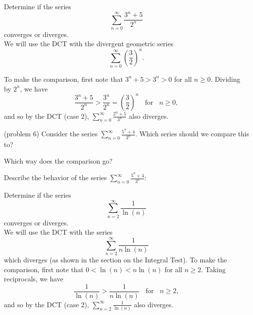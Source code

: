 \documentclass{ximera}
\begin{document}
\begin{example}[example 6] %
Determine if the series 
\[
\sum_{n=0}^\infty \frac{3^n + 5}{2^n}
\]
 converges or diverges.\\
We will use the DCT with the divergent geometric series 
\[
\sum_{n=0}^\infty \left(\frac32\right)^n.
\]

To make the comparison, first note that $3^n + 5 > 3^n > 0$ for all $n \geq 0$. Dividing by $2^n$, we have 
\[
\frac{3^n + 5}{2^n} > \frac{3^n}{2^n} = \left(\frac32\right)^n \;\; \text{ for } \;\; n \geq 0,
\]
and so by the DCT (case 2), $\sum_{n=0}^\infty \frac{2^n + 5}{3^n}$ also diverges.
\end{example}


\begin{problem}(problem 6)
Consider the series $\displaystyle{\sum_{n=0}^\infty \frac{5^n + 4}{3^n}}$.
Which series should we compare this to?

\begin{multipleChoice}
\end{multipleChoice}

Which way does the comparison go?
\begin{multipleChoice}
\end{multipleChoice}

Describe the behavior of the series $\sum_{n=0}^\infty \frac{5^n + 4}{3^n}:$
\begin{multipleChoice}
\end{multipleChoice}

\end{problem}



\begin{example}[example 7] %
Determine if the series 
\[
\sum_{n=2}^\infty \frac{1}{\ln(n)}
\]
converges or diverges.\\
We will use the DCT with the series 
\[
\sum_{n=2}^\infty \frac{1}{n\ln(n)}
\]
 which diverges (as shown in the section on the Integral Test).
To make the comparison, first note that $0 < \ln(n) < n\ln(n)$ for all $n \geq 2$. Taking reciprocals, we have 
\[
\frac{1}{\ln(n)} > \frac{1}{n\ln(n)}  \;\; \text{ for } \;\; n \geq 2,
\]
and so by the DCT (case 2), $\sum_{n=2}^\infty \frac{1}{\ln(n)}$ also diverges.
\end{example}
\end{document}
